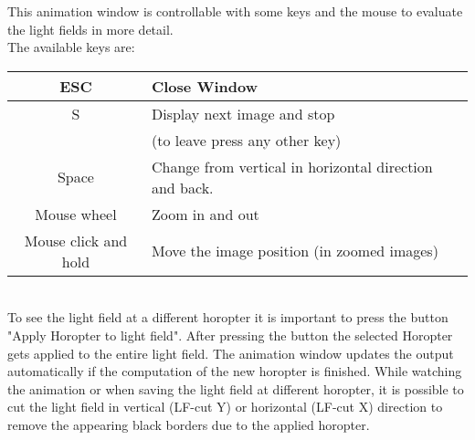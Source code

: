 %
This animation window is controllable with some keys and the mouse to evaluate the light fields in more detail.\\
%
\newline
%
The available keys are:
%
\begin{table}[h]
\begin{tabular}{c|l}
ESC & Close Window \\ \hline
S & Display next image and stop \\ 
& (to leave press any other key) \\ \hline
Space & Change from vertical in horizontal direction and back.\\ \hline
Mouse wheel & Zoom in and out \\ \hline
Mouse click and hold & Move the image position (in zoomed images)  
\end{tabular}
\end{table}
%
\\
%
To see the light field at a different horopter it is important to press the button "Apply Horopter to light field".
%
After pressing the button the selected Horopter gets applied to the entire light field.
%
The animation window updates the output automatically if the computation of the new horopter is finished.   
%
While watching the animation or when saving the light field at different horopter, it is possible to cut the light field in vertical (LF-cut Y) or horizontal (LF-cut X) direction to remove the appearing black borders due to the applied horopter.
%

%
\newpage
%
